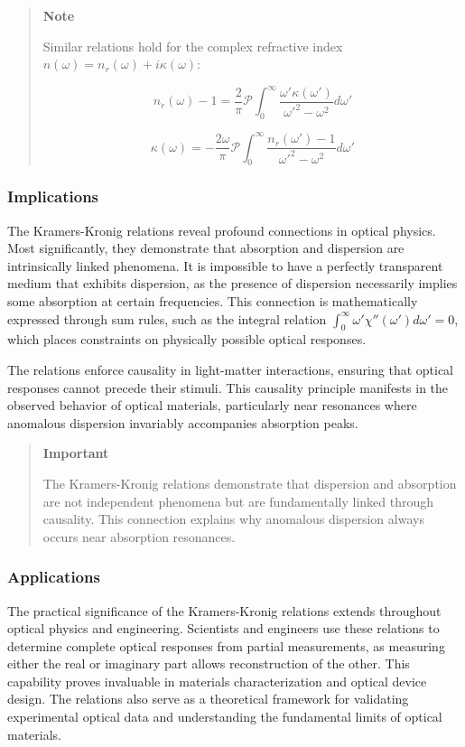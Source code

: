 \documentclass[
  a4paper,
]{book}
\begin{document}
\begin{tcolorbox}
\begin{quote}
\textbf{Note}

Similar relations hold for the complex refractive index
\(n(\omega)=n_r(\omega)+i\kappa(\omega)\):

\[
n_r(\omega)-1 = \frac{2}{\pi}\mathcal{P}\int_{0}^{\infty}\frac{\omega'\kappa(\omega')}{\omega'^2-\omega^2}d\omega'
\]

\[
\kappa(\omega) = -\frac{2\omega}{\pi}\mathcal{P}\int_{0}^{\infty}\frac{n_r(\omega')-1}{\omega'^2-\omega^2}d\omega'
\]
\end{quote}

\subsubsection{Implications}\label{implications}

The Kramers-Kronig relations reveal profound connections in optical
physics. Most significantly, they demonstrate that absorption and
dispersion are intrinsically linked phenomena. It is impossible to have
a perfectly transparent medium that exhibits dispersion, as the presence
of dispersion necessarily implies some absorption at certain
frequencies. This connection is mathematically expressed through sum
rules, such as the integral relation
\(\int_0^\infty \omega'\chi''(\omega')d\omega' = 0\), which places
constraints on physically possible optical responses.

The relations enforce causality in light-matter interactions, ensuring
that optical responses cannot precede their stimuli. This causality
principle manifests in the observed behavior of optical materials,
particularly near resonances where anomalous dispersion invariably
accompanies absorption peaks.

\begin{quote}
\textbf{Important}

The Kramers-Kronig relations demonstrate that dispersion and absorption
are not independent phenomena but are fundamentally linked through
causality. This connection explains why anomalous dispersion always
occurs near absorption resonances.
\end{quote}

\subsubsection{Applications}\label{applications-1}

The practical significance of the Kramers-Kronig relations extends
throughout optical physics and engineering. Scientists and engineers use
these relations to determine complete optical responses from partial
measurements, as measuring either the real or imaginary part allows
reconstruction of the other. This capability proves invaluable in
materials characterization and optical device design. The relations also
serve as a theoretical framework for validating experimental optical
data and understanding the fundamental limits of optical materials.


\end{tcolorbox}
\end{document}
